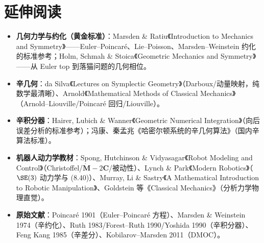 \section*{延伸阅读}
\begin{itemize}
  \item \textbf{几何力学与约化（黄金标准）}：Marsden \& Ratiu《Introduction to Mechanics and Symmetry》——Euler--Poincaré、Lie--Poisson、Marsden--Weinstein 约化的标准参考；Holm, Schmah \& Stoica《Geometric Mechanics and Symmetry》\cite{holm2009geometric}——从 Euler top 到落猫问题的几何相位。
  \item \textbf{辛几何}：da Silva《Lectures on Symplectic Geometry》\cite{dasilva2008lectures}（Darboux/动量映射，纯数学最清晰）、Arnold《Mathematical Methods of Classical Mechanics》\cite{arnold1989mathematical}（Arnold--Liouville/Poincaré 回归/Liouville）。
  \item \textbf{辛积分器}：Hairer, Lubich \& Wanner《Geometric Numerical Integration》\cite{hairer2006geometric}（向后误差分析的标准参考）；冯康、秦孟兆《哈密尔顿系统的辛几何算法》\cite{feng2003symplectic}（国内辛算法标准）。
  \item \textbf{机器人动力学教材}：Spong, Hutchinson \& Vidyasagar《Robot Modeling and Control》\cite{spong2006robot}（Christoffel/$\dot{\mathbf M}-2\mathbf C$/被动性）、Lynch \& Park《Modern Robotics》\cite{lynch2017modern}（$\SE(3)$ 动力学与 (8.40)）、Murray, Li \& Sastry《A Mathematical Introduction to Robotic Manipulation》\cite{murray1994mathematical}、Goldstein 等《Classical Mechanics》\cite{goldstein2002classical}（分析力学物理直觉）。
  \item \textbf{原始文献}：Poincaré 1901（Euler--Poincaré 方程\cite{poincare1901forme}）、Marsden \& Weinstein 1974（辛约化\cite{marsden1974reduction}）、Ruth 1983/Forest--Ruth 1990/Yoshida 1990（辛积分器\cite{ruth1983canonical}\cite{forest1990fourth}\cite{yoshida1990construction}）、Feng Kang 1985（辛差分\cite{feng1985difference}）、Kobilarov--Marsden 2011（DMOC\cite{kobilarov2011discrete}）。
\end{itemize}


